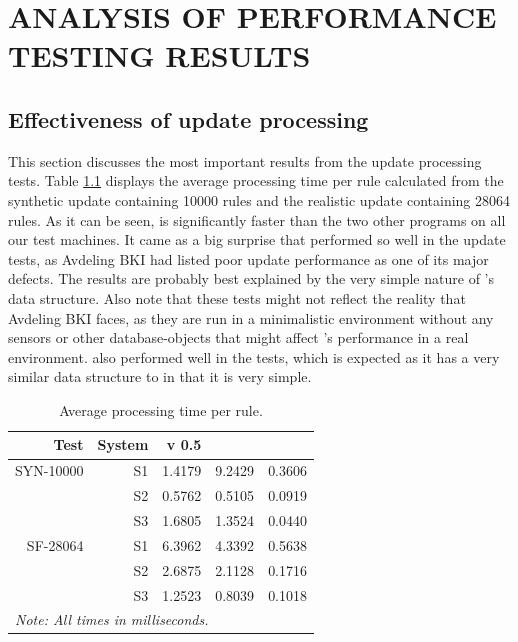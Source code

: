 
\chapter{ANALYSIS OF PERFORMANCE TESTING RESULTS}
\label{chap:analysis_of_results}
% 

\section{Effectiveness of update processing}
This section discusses the most important results from the update processing
tests. Table \ref{tab:timeperrule} displays the average processing time per rule
calculated from the synthetic update containing 10000 rules and the realistic update containing
28064 rules. As it can be seen, \bhtb{} is significantly faster than the two
other programs on all our test machines. It came as a big
surprise that \bhtb{} performed so well in the update tests, as Avdeling BKI had
listed poor update performance as one of its major defects. The results are probably best explained by the very simple nature
of \bhtb{}'s data structure. Also note that these tests might not reflect the
reality that Avdeling BKI faces, as they are run in a minimalistic environment
without any sensors or other database-objects that might affect \bhtb{}'s
performance in a real environment. \snortmanager{} also performed well in the
tests, which is expected as it has a very similar data structure to \bhtb{} in
that it is very simple. 

\renewcommand{\arraystretch}{1.5}

\begin{table}[h!]
  \centering
  \begin{tabular}{r|r|r|r|r}
Test & System & \snowman{} v 0.5 & \snortmanager{} & \bhtb{} \\
\hline
SYN-10000 & S1 & 1.4179 & 9.2429 & 0.3606 \\
 & S2 & 0.5762 & 0.5105 & 0.0919 \\
 & S3 & 1.6805 & 1.3524 & 0.0440 \\
 \hline
SF-28064 & S1 & 6.3962 & 4.3392 & 0.5638 \\
 & S2 & 2.6875 & 2.1128 & 0.1716 \\
 & S3 & 1.2523 & 0.8039 & 0.1018 \\
	\hline
\multicolumn{5}{l}{\textit{Note: All times in milliseconds.}}
  \end{tabular}
  \caption{Average processing time per rule.}
  \label{tab:timeperrule}
\end{table}

